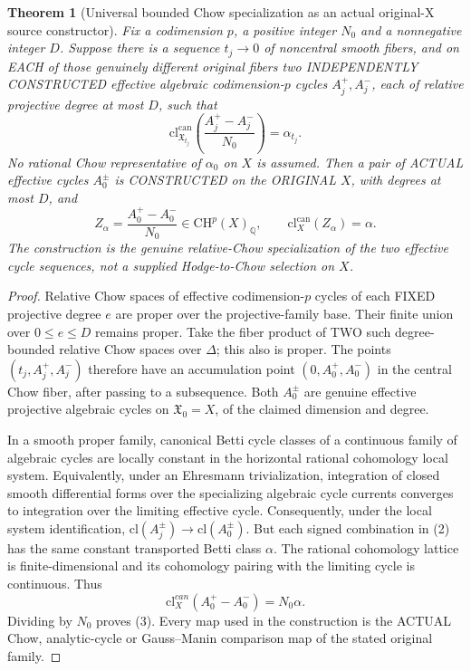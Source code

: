 \documentclass[11pt]{article}
\newcommand{\Q}{\mathbb Q}
\newcommand{\CH}{\mathrm{CH}}
\newcommand{\cl}{\mathrm{cl}}
\newtheorem{theorem}{Theorem}
\begin{document}
\begin{theorem}[Universal bounded Chow specialization as an actual original-X source constructor]
Fix a codimension \(p\), a positive integer
\(N_0\) and a nonnegative integer \(D\).
Suppose there is a sequence \(t_j\to0\)
of noncentral smooth fibers, and on EACH
of those genuinely different original
fibers two INDEPENDENTLY CONSTRUCTED
effective algebraic codimension-\(p\)
cycles \(A_j^+,A_j^-\), each of relative
projective degree at most \(D\), such that
\[
 \boxed{
 \cl_{\mathfrak X_{t_j}}^{\mathrm{can}}
          \left(\frac{A_j^+-A_j^-}{N_0}\right)
                         =\alpha_{t_j}.}          \tag{2}
\]
No rational Chow representative of \(\alpha_0\)
on \(X\) is assumed.
Then a pair of ACTUAL effective
cycles \(A_0^\pm\) is CONSTRUCTED on
the ORIGINAL \(X\), with
degrees at most \(D\), and
\[
 \boxed{
 Z_\alpha=\frac{A_0^+-A_0^-}{N_0}
        \in\CH^p(X)_\Q,\qquad
 \cl_X^{\mathrm{can}}(Z_\alpha)=\alpha.}           \tag{3}
\]
The construction is the genuine
relative-Chow specialization of the
two effective cycle sequences, not
a supplied Hodge-to-Chow selection on \(X\).
\end{theorem}
\begin{proof}
Relative Chow spaces of effective
codimension-\(p\) cycles of each FIXED
projective degree \(e\) are proper over
the projective-family base. Their finite
union over \(0\le e\le D\) remains proper.
Take the fiber product of TWO such
degree-bounded relative Chow spaces
over \(\Delta\); this also is proper.
The points \((t_j,A_j^+,A_j^-)\)
therefore have an accumulation point
\((0,A_0^+,A_0^-)\) in the central
Chow fiber, after passing to a
subsequence. Both \(A_0^\pm\) are
genuine effective projective algebraic
cycles on \(\mathfrak X_0=X\), of the
claimed dimension and degree.

In a smooth proper family, canonical
Betti cycle classes of a
continuous family of algebraic cycles
are locally constant in the
horizontal rational cohomology local
system. Equivalently, under an
Ehresmann trivialization,
integration of closed smooth
differential forms over the
specializing algebraic cycle currents
converges to integration over the
limiting effective cycle.
Consequently, under the local system
identification,
\(
 \cl(A_j^\pm)\to\cl(A_0^\pm).
\)
But each signed combination in (2)
has the same constant transported
Betti class \(\alpha\).
The rational cohomology lattice is
finite-dimensional and its
cohomology pairing with the
limiting cycle is continuous.
Thus
\[
 \cl_X^{can}(A_0^+-A_0^-)
     =N_0\alpha.
\]
Dividing by \(N_0\) proves (3).
Every map used in the construction
is the ACTUAL Chow, analytic-cycle
or Gauss--Manin comparison map of the
stated original family.
\end{proof}
\end{document}

